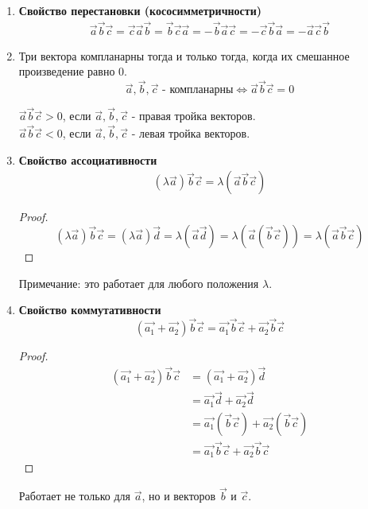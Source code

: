 \begin{enumerate}
  \item \textbf{Свойство перестановки (кососимметричности)} \\
    \begin{gather*}
      \vec{a} \vec{b} \vec{c} = \vec{c} \vec{a} \vec{b} = \vec{b} \vec{c} \vec{a} = -\vec{b} \vec{a} \vec{c} = - \vec{c} \vec{b} \vec{a} = - \vec{a} \vec{c} \vec{b}
    \end{gather*}

  \item Три вектора компланарны тогда и только тогда, когда их смешанное произведение равно 0. \[
  \vec{a}, \vec{b}, \vec{c} \text{ - компланарны} \iff \vec{a} \vec{b} \vec{c} = 0
  \] 
    \begin{note}
      $\vec{a} \vec{b} \vec{c} > 0$, если $\vec{a}, \vec{b}, \vec{c}$ - правая тройка векторов. \\
      $\vec{a} \vec{b} \vec{c} < 0$, если $\vec{a}, \vec{b}, \vec{c}$ - левая тройка векторов.
    \end{note}

  \item \textbf{Свойство ассоциативности} \\
    \begin{gather*}
      (\lambda \vec{a}) \vec{b} \vec{c} = \lambda (\vec{a} \vec{b} \vec{c})
    \end{gather*}
      \begin{proof}
        \[(\lambda \vec{a}) \vec{b} \vec{c} = (\lambda \vec{a}) \vec{d} = \lambda (\vec{a} \vec{d}) = \lambda (\vec{a} (\vec{b} \vec{c})) = \lambda (\vec{a} \vec{b} \vec{c})\]
      \end{proof}
      \begin{note}
        Примечание: это работает для любого положения $\lambda$.
      \end{note}

  \item \textbf{Свойство коммутативности} 
    \[
      (\vec{a_1} + \vec{a_2}) \vec{b} \vec{c} = \vec{a_1} \vec{b} \vec{c} + \vec{a_2} \vec{b} \vec{c}
    \] 
    \begin{proof}
      \begin{align*}
        (\vec{a_1} + \vec{a_2}) \vec{b} \vec{c} 
          &= (\vec{a_1} + \vec{a_2}) \vec{d}\\
          &= \vec{a_1} \vec{d} + \vec{a_2} \vec{d}\\
          &= \vec{a_1} (\vec{b} \vec{c}) + \vec{a_2} (\vec{b} \vec{c})\\
          &= \vec{a_1} \vec{b} \vec{c} + \vec{a_2} \vec{b} \vec{c}
      \end{align*}
    \end{proof}
    \begin{note}
      Работает не только для $\vec{a}$, но и векторов $\vec{b}$ и $\vec{c}$.
    \end{note}
\end{enumerate}

